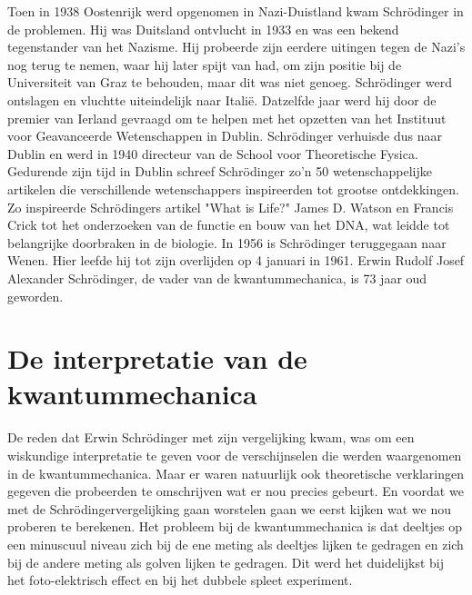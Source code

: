 \documentclass[11pt,fleqn]{book} %
\begin{document}
Toen in 1938 Oostenrijk werd opgenomen in Nazi-Duistland kwam Schrödinger in de problemen. Hij was Duitsland ontvlucht in 1933 en was een bekend tegenstander van het Nazisme. Hij probeerde zijn eerdere uitingen tegen de Nazi’s nog terug te nemen, waar hij later spijt van had, om zijn positie bij de Universiteit van Graz te behouden, maar dit was niet genoeg. Schrödinger werd ontslagen en vluchtte uiteindelijk naar Italië. Datzelfde jaar werd hij door de premier van Ierland gevraagd om te helpen met het opzetten van het Instituut voor Geavanceerde Wetenschappen in Dublin. Schrödinger verhuisde dus naar Dublin en werd in 1940 directeur van de School voor Theoretische Fysica. Gedurende zijn tijd in Dublin schreef Schrödinger zo’n 50 wetenschappelijke artikelen die verschillende wetenschappers inspireerden tot grootse ontdekkingen. Zo inspireerde Schrödingers artikel "What is Life?" James D. Watson en Francis Crick tot het onderzoeken van de functie en bouw van het DNA, wat leidde tot belangrijke doorbraken in de biologie.
In 1956 is Schrödinger teruggegaan naar Wenen. Hier leefde hij tot zijn overlijden op 4 januari in 1961. Erwin Rudolf Josef Alexander Schrödinger, de vader van de kwantummechanica, is 73 jaar oud geworden\cite{schr}.

\section{De interpretatie van de kwantummechanica}
De reden dat Erwin Schrödinger met zijn vergelijking kwam, was om een wiskundige interpretatie te geven voor de verschijnselen die werden waargenomen in de kwantummechanica. Maar er waren natuurlijk ook theoretische verklaringen gegeven die probeerden te omschrijven wat er nou precies gebeurt. En voordat we met de Schrödingervergelijking gaan worstelen gaan we eerst kijken wat we nou proberen te berekenen.
Het probleem bij de kwantummechanica is dat deeltjes op een minuscuul niveau zich bij de ene meting als deeltjes lijken te gedragen en zich bij de andere meting als golven lijken te gedragen. Dit werd het duidelijkst bij het foto-elektrisch effect en bij het dubbele spleet experiment.
\end{document}
